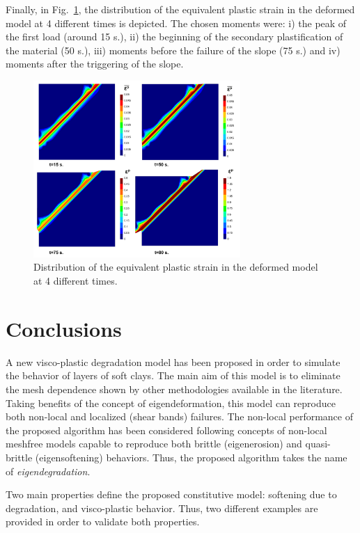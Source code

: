 \documentclass[applsci,journal,article,submit,moreauthors,pdftex]{Definitions/mdpi}
\begin{document}
Finally, in Fig.~\ref{fig_VC4}, the distribution of the equivalent plastic strain in the deformed model at 4 different times is depicted. The chosen moments were: i) the peak of the first load (around 15 s.), ii) the beginning of the secondary plastification of the material (50 s.), iii) moments before the failure of the slope (75 s.) and iv) moments after the triggering of the slope. 

\begin{figure}
\includegraphics[width=0.7\textwidth]{Figs/EP_VC.pdf}
\caption{Distribution of the equivalent plastic strain in the deformed model at 4 different times.}
\label{fig_VC4}
\end{figure}

\section{Conclusions}

A new visco-plastic degradation model has been proposed in order to simulate the behavior of layers of soft clays. The main aim of this model is to eliminate the mesh dependence shown by other methodologies available in the literature. Taking benefits of the concept of eigendeformation, this model can reproduce both non-local and localized (shear bands) failures. The non-local performance of the proposed algorithm has been considered following concepts of non-local meshfree models capable to reproduce both brittle (eigenerosion) and quasi-brittle (eigensoftening) behaviors. Thus, the proposed algorithm takes the name of \textit{eigendegradation}.

Two main properties define the proposed constitutive model: softening due to degradation, and visco-plastic behavior. Thus, two different examples are provided in order to validate both properties.
\end{document}
